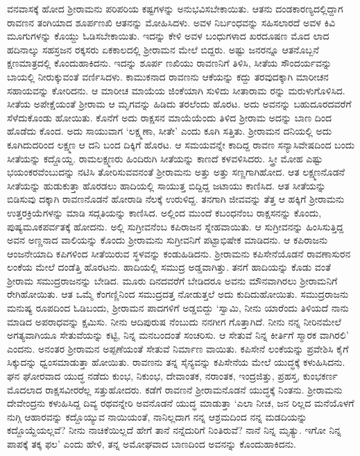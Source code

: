 ವನವಾಸಕ್ಕೆ ಹೋದ ಶ್ರೀರಾಮನು ಪರಿಪರಿಯ ಕಷ್ಟಗಳನ್ನು ಅನುಭವಿಸಬೇಕಾಯಿತು. ಆತನು ದಂಡಕಾರಣ್ಯದಲ್ಲಿದ್ದಾಗ ರಾವಣನ ತಂಗಿಯಾದ ಶೂರ್ಪಣಖಿ ಆತನನ್ನು ಮೋಹಿಸಿದಳು. ಅವಳ ನಿರ್ಬಂಧವನ್ನು ಸಹಿಸಲಾರದೆ ಅವಳ ಕಿವಿ ಮೂಗುಗಳನ್ನು ಕೊಯ್ದು ಓಡಿಸಬೇಕಾಯಿತು. ಇದನ್ನು ಕೇಳಿ ಅವಳ ಬಂಧುಗಳಾದ ಖರದೂಷಣ ಮೊದ ಲಾದ ಹದಿನಾಲ್ಕು ಸಹಸ್ರಜನ ರಕ್ಕಸರು ಏಕಕಾಲದಲ್ಲಿ ಶ್ರೀರಾಮನ ಮೇಲೆ ಬಿದ್ದರು. ಅಷ್ಟು ಜನರನ್ನೂ ಆತನೊಬ್ಬನೆ ಕ್ಷಣಮಾತ್ರದಲ್ಲಿ ಕೊಂದುಹಾಕಿದನು. ಇದನ್ನು ಶೂರ್ಪ ಣಖಿಯು ರಾವಣನಿಗೆ ತಿಳಿಸಿ, ಸೀತೆಯ ಸೌಂದರ್ಯವನ್ನು ಬಾಯಲ್ಲಿ ನೀರುಕ್ಕುವಂತೆ ವರ್ಣಿಸಿದಳು. ಕಾಮುಕನಾದ ರಾವಣನು ಆಕೆಯನ್ನು ಕದ್ದು ತರವುದಕ್ಕಾಗಿ ಮಾರೀಚನ ಸಹಾಯವನ್ನು ಕೋರಿದನು. ಆ ಮಾರೀಚ ಮಾಯೆಯ ಜಿಂಕೆಯಾಗಿ ಸುಳಿದು ಸೀತಾರಾಮ ರನ್ನು ಮರುಳುಗೊಳಿಸಿದ. ಸೀತೆಯ ಅಪೇಕ್ಷೆಯಂತೆ ಶ್ರೀರಾಮ ಆ ಮೃಗವನ್ನು ಹಿಡಿದು ತರಲೆಂದು ಹೊರಟ. ಅದು ಅವನನ್ನು ಬಹುದೂರದವರೆಗೆ ಸೆಳೆದುಕೊಂಡು ಹೋಯಿತು. ಕೊನೆಗೆ ಅದು ರಾಕ್ಷಸನ ಮಾಯೆಯೆಂದು ತಿಳಿದ ಶ್ರೀರಾಮ ಅದನ್ನು ಬಾಣ ದಿಂದ ಹೊಡೆದು ಕೊಂದ. ಅದು ಸಾಯುವಾಗ ‘ಲಕ್ಷ್ಮಣಾ, ಸೀತೇ’ ಎಂದು ಕೂಗಿ ಸತ್ತಿತು. ಶ್ರೀರಾಮನ ದನಿಯಲ್ಲಿ ಅದು ಕೂಗಿದುದರಿಂದ ಲಕ್ಷ್ಮಣ ಆ ದನಿ ಬಂದ ದಿಕ್ಕಿಗೆ ಹೊರಟ. ಆ ಸಮಯವನ್ನೇ ಕಾದಿದ್ದ ರಾವಣ ಸನ್ಯಾಸಿವೇಷದಿಂದ ಬಂದು ಸೀತೆಯನ್ನು ಕದ್ದೊಯ್ದ. ರಾಮಲಕ್ಷ್ಮಣರು ಹಿಂದಿರುಗಿ ಸೀತೆಯನ್ನು ಕಾಣದೆ ಕಳವಳಿಸಿದರು. ಸ್ತ್ರೀ ಮೋಹ ಎಷ್ಟು ಭಯಂಕರವೆಂಬುದನ್ನು ನಟಿಸಿ ತೋರಿಸುವವನಂತೆ ಶ್ರೀರಾಮನು ಅತ್ತು ಅತ್ತು ಸಣ್ಣಗಾಗಿಹೋದ. ಆತ ಲಕ್ಷ್ಮಣನೊಡನೆ ಸೀತೆಯನ್ನು ಹುಡುಕುತ್ತಾ ಹೊರಡಲು ಹಾದಿಯಲ್ಲಿ ಸಾಯುತ್ತ ಬಿದ್ದಿದ್ದ ಜಟಾಯು ಕಾಣಿಸಿದ. ಆತ ಸೀತೆಯನ್ನು ಬಿಡಿಸುವು ದಕ್ಕಾಗಿ ರಾವಣನೊಡನೆ ಹೋರಾಡಿ ನೆಲಕ್ಕೆ ಉರುಳಿದ್ದ. ತನಗಾಗಿ ಜೀವವನ್ನು ತೆತ್ತ ಆ ಹಕ್ಕಿಗೆ ಶ್ರೀರಾಮನು ಉತ್ತರಕ್ರಿಯೆಗಳನ್ನು ಮಾಡಿ ಸದ್ಗತಿಯನ್ನು ಕಾಣಿಸಿದ. ಅಲ್ಲಿಂದ ಮುಂದೆ ಕಬಂಧನೆಂಬ ರಾಕ್ಷಸನನ್ನು ಕೊಂದು, ಪುಷ್ಯಮೂಕಪರ್ವತಕ್ಕೆ ಹೋದನು. ಅಲ್ಲಿ ಸುಗ್ರೀವನೆಂಬ ಕಪಿರಾಜನ ಸ್ನೇಹವಾಯಿತು. ಆ ಸುಗ್ರೀವನನ್ನು ಹಿಂಸಿಸುತ್ತಿದ್ದ ಅವನ ಅಣ್ಣನಾದ ವಾಲಿಯನ್ನು ಕೊಂದು ಶ್ರೀರಾಮನು ಸುಗ್ರೀವನಿಗೆ ಪಟ್ಟಾಭಿಷೇಕ ಮಾಡಿದನು. ಆ ಕಪಿರಾಜನು ಆಂಜನೇಯಾದಿ ಕಪಿಗಳಿಂದ ಸೀತೆಯಿರುವ ಸ್ಥಳವನ್ನು ಕಂಡುಹಿಡಿದನು. ಶ್ರೀರಾಮನು ಕಪಿಸೇನೆಯೊಡನೆ ರಾವಣಾಸುರನ ಲಂಕೆಯ ಮೇಲೆ ದಂಡೆತ್ತಿ ಹೊರಟನು. ಹಾದಿಯಲ್ಲಿ ಸಮುದ್ರ ಅಡ್ಡವಾಗಿತ್ತು. ತನಗೆ ಹಾದಿಯನ್ನು ಕೊಡು ವಂತೆ ಶ್ರೀರಾಮ ಸಮುದ್ರರಾಜನನ್ನು ಬೇಡಿದ. ಮೂರು ದಿನದವರೆಗೆ ಬೇಡಿದರೂ ಅವನು ಮೌನವಾಗಿರಲು ಶ್ರೀರಾಮನಿಗೆ ರೇಗಿಹೋಯಿತು. ಆತ ಒಮ್ಮೆ ಕೆಂಗಣ್ಣಿನಿಂದ ಸಮುದ್ರದತ್ತ ನೋಡುತ್ತಲೆ ಅದು ಕುದಿದುಹೋಯಿತು. ಸಮುದ್ರರಾಜನು ಮನುಷ್ಯ ರೂಪದಿಂದ ಓಡಿಬಂದು, ಶ್ರೀರಾಮನ ಪಾದಗಳಿಗೆ ಅಡ್ಡಬಿದ್ದು ‘ಸ್ವಾಮಿ, ನೀನು ಯಾರೆಂದು ತಿಳಿಯದೆ ನಾನು ಮಾಡಿದ ಅಪರಾಧವನ್ನು ಕ್ಷಮಿಸು. ನೀನು ಆದಿಪುರುಷ ನೆಂಬುದು ನನಗೀಗ ಗೊತ್ತಾಗಿದೆ. ನೀನು ನನ್ನ ನೀರಿನಮೇಲೆ ಅಗತ್ಯವಾಗಿಯೂ ಸೇತುವೆಯನ್ನು ಕಟ್ಟಿ, ನಿನ್ನ ಮನಬಂದಂತೆ ಸಂಚರಿಸು. ಆ ಸೇತುವೆ ನಿನ್ನ ಕೀರ್ತಿಗೆ ಸ್ಮಾರಕ ವಾಗಿರಲಿ’ ಎಂದನು. ಅನಂತರ ಶ್ರೀರಾಮನ ಅಪ್ಪಣೆಯಂತೆ ಸೇತುವೆ ನಿರ್ಮಾಣ ವಾಯಿತು. ಕಪಿಸೇನೆ ಲಂಕೆಯನ್ನು ಪ್ರವೇಶಿಸಿ ಕೈಗೆ ಸಿಕ್ಕುದನ್ನು ಧ್ವಂಸಮಾಡುತ್ತಾ ಹೋಯಿತು. ರಾವಣನು ತನ್ನ ಸೈನ್ಯವನ್ನು ಕಪಿಸೇನೆಯ ಮೇಲೆ ಯುದ್ಧಕ್ಕೆ ಕಳುಹಿಸಿದನು. ಘನ ಘೋರವಾದ ಯುದ್ಧ ನಡೆದು ಕುಂಭ, ನಿಕುಂಭ, ದೇವಾಂತಕ, ನರಾಂತಕ, ಇಂದ್ರಜಿತ್ತು, ಪ್ರಹಸ್ತ, ಕುಂಭಕರ್ಣ ಮೊದಲಾದ ರಾಕ್ಷಸವೀರರೆಲ್ಲ ಸತ್ತುಹೋದರು. ಕಡೆಗೆ ರಾವಣನೆ ಶ್ರೀರಾಮನೊಡನೆ ಯುದ್ಧಕ್ಕೆ ನಿಂತನು. ಶ್ರೀರಾಮನು ದೇವೇಂದ್ರನು ಕಳುಹಿಸಿದ್ದ ದಿವ್ಯ ರಥವನ್ನೇರಿ ಅವನೊಡನೆ ಯುದ್ಧ ಮಾಡುತ್ತಾ ‘ಎಲಾ ನೀಚ, ಜನ ರಿಲ್ಲದ ಮನೆಯೊಳಗೆ ನುಗ್ಗಿ ಆಹಾರವನ್ನು ಕದ್ದೊಯ್ಯುವ ನಾಯಿಯಂತೆ, ನಾನಿಲ್ಲದಾಗ ನನ್ನ ಆಶ್ರಮದಿಂದ ನನ್ನ ಮಡದಿಯನ್ನು ಕದ್ದೊಯ್ದೆಯಲ್ಲವೆ? ನೀನು ನಾಚಿಕೆಯಿಲ್ಲದೆ ಹೇಗೆ ತಾನೆ ನನ್ನೆದುರಿಗೆ ನಿಂತಿರುವೆ? ನಾನೆ ನಿನ್ನ ಮೃತ್ಯು. ಇಗೋ ನಿನ್ನ ಪಾಪಕ್ಕೆ ತಕ್ಕ ಫಲ’ ಎಂದು ಹೇಳಿ, ತನ್ನ ಅಮೋಘವಾದ ಬಾಣದಿಂದ ಅವನನ್ನು ಕೊಂದುಹಾಕಿದನು.

